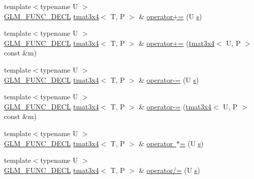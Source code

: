 \begin{DoxyCompactItemize}
\item 
{\footnotesize template$<$typename U $>$ }\\\mbox{\hyperlink{setup_8hpp_ab2d052de21a70539923e9bcbf6e83a51}{G\+L\+M\+\_\+\+F\+U\+N\+C\+\_\+\+D\+E\+CL}} \mbox{\hyperlink{structglm_1_1tmat3x4}{tmat3x4}}$<$ T, P $>$ \& \mbox{\hyperlink{structglm_1_1tmat3x4_a1d168f808a356984b260bf15c3ab8e9e}{operator+=}} (U \mbox{\hyperlink{glad_8h_af1b1d5edfea6a34daee7389b1b5810ad}{s}})
\item 
{\footnotesize template$<$typename U $>$ }\\\mbox{\hyperlink{setup_8hpp_ab2d052de21a70539923e9bcbf6e83a51}{G\+L\+M\+\_\+\+F\+U\+N\+C\+\_\+\+D\+E\+CL}} \mbox{\hyperlink{structglm_1_1tmat3x4}{tmat3x4}}$<$ T, P $>$ \& \mbox{\hyperlink{structglm_1_1tmat3x4_abf14c7b0bb58128011f4d0283b95cd8e}{operator+=}} (\mbox{\hyperlink{structglm_1_1tmat3x4}{tmat3x4}}$<$ U, P $>$ const \&m)
\item 
{\footnotesize template$<$typename U $>$ }\\\mbox{\hyperlink{setup_8hpp_ab2d052de21a70539923e9bcbf6e83a51}{G\+L\+M\+\_\+\+F\+U\+N\+C\+\_\+\+D\+E\+CL}} \mbox{\hyperlink{structglm_1_1tmat3x4}{tmat3x4}}$<$ T, P $>$ \& \mbox{\hyperlink{structglm_1_1tmat3x4_a42717b0d74b50223515dc81fd6e76d91}{operator-\/=}} (U \mbox{\hyperlink{glad_8h_af1b1d5edfea6a34daee7389b1b5810ad}{s}})
\item 
{\footnotesize template$<$typename U $>$ }\\\mbox{\hyperlink{setup_8hpp_ab2d052de21a70539923e9bcbf6e83a51}{G\+L\+M\+\_\+\+F\+U\+N\+C\+\_\+\+D\+E\+CL}} \mbox{\hyperlink{structglm_1_1tmat3x4}{tmat3x4}}$<$ T, P $>$ \& \mbox{\hyperlink{structglm_1_1tmat3x4_aaf8bc23469dcf8ffbae4ea49c9ced2cd}{operator-\/=}} (\mbox{\hyperlink{structglm_1_1tmat3x4}{tmat3x4}}$<$ U, P $>$ const \&m)
\item 
{\footnotesize template$<$typename U $>$ }\\\mbox{\hyperlink{setup_8hpp_ab2d052de21a70539923e9bcbf6e83a51}{G\+L\+M\+\_\+\+F\+U\+N\+C\+\_\+\+D\+E\+CL}} \mbox{\hyperlink{structglm_1_1tmat3x4}{tmat3x4}}$<$ T, P $>$ \& \mbox{\hyperlink{structglm_1_1tmat3x4_a28d4189833c5b2b9fed755c15c992ad8}{operator $\ast$=}} (U \mbox{\hyperlink{glad_8h_af1b1d5edfea6a34daee7389b1b5810ad}{s}})
\item 
{\footnotesize template$<$typename U $>$ }\\\mbox{\hyperlink{setup_8hpp_ab2d052de21a70539923e9bcbf6e83a51}{G\+L\+M\+\_\+\+F\+U\+N\+C\+\_\+\+D\+E\+CL}} \mbox{\hyperlink{structglm_1_1tmat3x4}{tmat3x4}}$<$ T, P $>$ \& \mbox{\hyperlink{structglm_1_1tmat3x4_a378211e46414746911e99ed1499a12bf}{operator/=}} (U \mbox{\hyperlink{glad_8h_af1b1d5edfea6a34daee7389b1b5810ad}{s}})

\end{DoxyCompactItemize}
